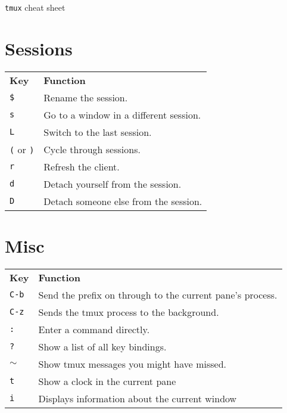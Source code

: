 \documentclass[landscape]{article}
\newcommand{\thead}[1]{{\color{black}\bf#1}}
\newcommand{\blankfirst}{%
  \ifodd\rownum\advance\rownum1\relax\fi}
\begin{document}
\thispagestyle{empty}
\begin{center}
  \Huge \texttt{tmux} cheat sheet%
\end{center}

\begin{multicols}{3}
  \small
  \section*{Sessions}
  \blankfirst
  \noindent\begin{tabular}{p{0.6in}p{2.3in}} %
    \thead{Key} & \thead{Function}\\
    \verb|$| & Rename the session.\\
    \verb|s| & Go to a window in a different session.\\
    \verb|L| & Switch to the last session.\\
    \verb|(| or \verb|)| & Cycle through sessions.\\
    \verb|r| & Refresh the client.\\
    \verb|d| & Detach yourself from the session.\\
    \verb|D| & Detach someone else from the session.\\
  \end{tabular}
  \section*{Misc}
  \blankfirst
  \noindent\begin{tabular}{p{0.6in}p{2.3in}} %
    \thead{Key} & \thead{Function}\\
    \verb|C-b| & Send the prefix on through to the current pane's process.\\
    \verb|C-z| & Sends the tmux process to the background.\\
    \verb|:| & Enter a command directly.\\
    \verb|?| & Show a list of all key bindings.\\
    $\mathtt \sim$ & Show tmux messages you might have missed.\\
    \verb|t| & Show a clock in the current pane\\
    \verb|i| & Displays information about the current window\\
  \end{tabular}  


\end{multicols}
\end{document}
